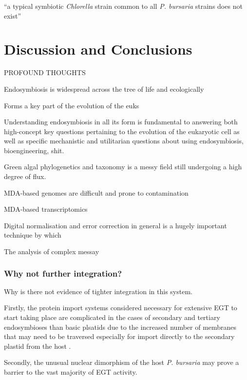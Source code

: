 \graphicspath{{chapters/7.Discussion/figures}}

\begin{savequote}[75mm]
    ``a typical symbiotic \textit{Chlorella} strain common to all \textit{P. bursaria}
    strains does not exist''
\end{savequote}

\chapter{Discussion and Conclusions}

PROFOUND THOUGHTS

Endosymbiosis 
is widespread across the tree of life and
ecologically

Forms a key part of the evolution of the euks


Understanding endosymbiosis in all its form is
fundamental to answering both high-concept key questions 
pertaining to the evolution
of the eukaryotic cell as well as specific mechanistic
and utilitarian questions about using
endosymbiosis, bioengineering, shit.


Green algal phylogenetics and taxonomy is a messy field still 
undergoing a high degree of flux. 

MDA-based genomes are difficult and prone to contamination 

MDA-based transcriptomics 


Digital normalisation and error correction in general is a hugely
important technique by which 




The analysis of complex messay 

\subsection{Why not further integration?}

Why is there not evidence of tighter integration in this system.

Firstly, the protein import systems considered necessary for extensive
EGT to start taking place are complicated
in the cases of secondary and tertiary endosymbioses
than basic plsatids due to the increased number
of membranes that may need to be traversed especially
for import directly to the secondary plastid from the
host \citep{Hirakawa2012}.


Secondly, the unusual nuclear dimorphism of the host \textit{P. bursaria}
may prove a barrier to the vast majority of EGT activity. 


